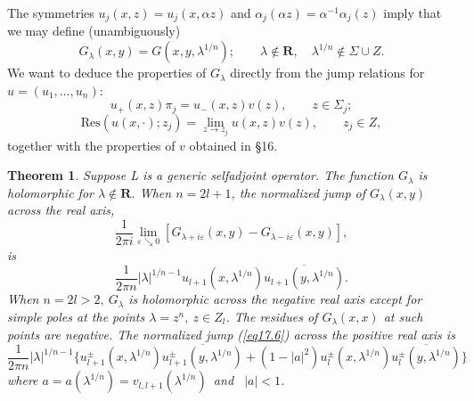 \documentclass{surv-l}
\theoremstyle{plain}
\newtheorem{theorem}{Theorem}[section]
\theoremstyle{definition}
\numberwithin{equation}{chapter}
\begin{document}
The symmetries $u_{j}(x,z)=u_{j}(x,\alpha z)$ and $\alpha_{j}(\alpha z)=\alpha^{-1}\alpha_{j}(z)$ imply that we may define (unambiguously)
\begin{equation}\label{eq17.3}
G_{\lambda}(x, y)=G(x, y,\lambda^{1/n});\qquad \lambda\not\in \mathbf{R},\quad \lambda^{1/n}\not\in\Sigma\cup Z.
\end{equation}
We want to deduce the properties of $G_{\lambda}$ directly from the jump relations for $u= (u_{1},\ldots,u_{n})$:
\begin{equation}\label{eq17.4}
u_{+}(x, z)\pi_{j}=u_{-}(x,z)v(z),\qquad z\in\Sigma_{j};
\end{equation}
\begin{equation*}
\mathrm{Res}(u(x,\cdot);z_{j})=\lim_{z\rightarrow z_{j}}u(x,z)v(z),\qquad z_{j}\in Z,
\end{equation*}
together with the properties of $v$ obtained in \S16.
\setcounter{theorem}{4}
\begin{theorem}\label{thm17.5}
Suppose L is a generic selfadjoint operator. The function $G_{\lambda}$ is holomorphic for $\lambda\not\in \mathbf{R}$. When $n=2l+1$, the normalized jump of $G_{\lambda}(x, y)$ across the real axis,
\setcounter{equation}{5}
\begin{equation}\label{eq17.6}
\frac{1}{2\pi i}\lim_{\varepsilon\searrow 0}[G_{\lambda+i\varepsilon}(x, y)-G_{\lambda-i\varepsilon}(x, y)],
\end{equation}
is
\begin{equation}\label{eq17.7}
\frac{1}{2\pi n}|\lambda|^{1/n-1}u_{l+1}(x,\lambda^{1/n})\overline{u_{l+1}(y,\lambda^{1/n})}.
\end{equation}
When $n =2l>2,\ G_{\lambda}$ is holomorphic across the negative real
axis except for simple poles at the points $\lambda=z^{n},\ z\in Z_{l}$. The residues of $G_{\lambda}(x, x)$ at such points are negative. The normalized jump (\ref{eq17.6})  across the positive real axis is
\begin{equation}\label{eq17.8}
\frac{1}{2\pi n}|\lambda|^{1/n-1}\{u_{l+1}^{\pm}(x, \lambda^{1/n})\overline{u_{l+1}^{\pm}(y, \lambda^{1/n})}+(1-|a|^{2})u_{l}^{\pm}(x, \lambda^{1/n})\overline{u_{l}^{\pm}(y,\lambda^{1/n})}\}
\end{equation}
where $a=a(\lambda^{1/n})=v_{l,l+1}(\lambda^{1/n})$\ and \ $|a|<1$.
\end{theorem}
\end{document}
